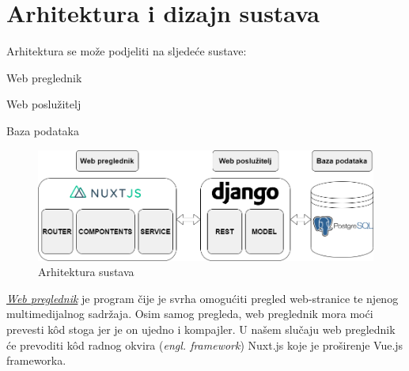\chapter{Arhitektura i dizajn sustava}
	Arhitektura se može podjeliti na sljedeće sustave:
	\begin{packed_item}
		\item 	Web preglednik
		\item 	Web poslužitelj
		\item 	Baza podataka
	\end{packed_item}	

	\begin{figure}[H]
		\centering
		\includegraphics[scale=0.45]{slike/ARHITEKTURA.PNG}
		\caption{Arhitektura sustava}
		\label{fig:promjene}
	\end{figure}	

	\underline{\textit{Web preglednik}} je program čije je svrha omogućiti pregled web-stranice te njenog multimedijalnog sadržaja. Osim samog pregleda, web preglednik mora moći prevesti kôd stoga jer je on ujedno i kompajler. U našem slučaju web preglednik će prevoditi kôd radnog okvira (\emph{engl. framework}) Nuxt.js koje je proširenje Vue.js frameworka.

